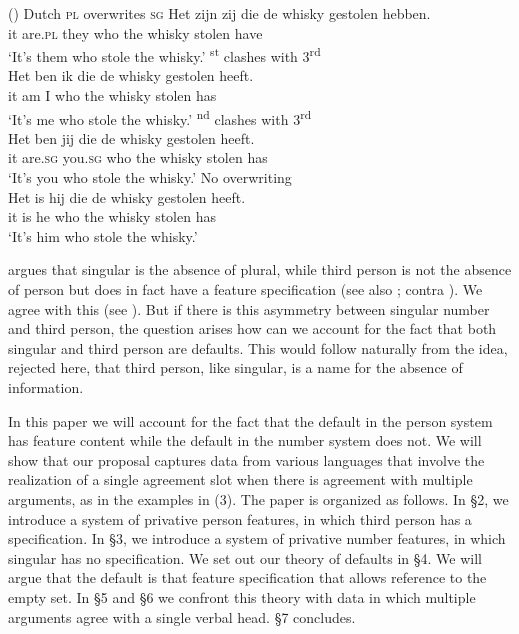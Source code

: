 \documentclass[output=paper]{langsci/langscibook}
\begin{document}
\ea (\label{bkm:Ref328731088}\label{bkm:Ref294426209})  Dutch
\ea \textsc{pl} overwrites \textsc{sg}
\gll Het zijn    zij    die  de  whisky gestolen hebben.\\
    it    are.\textsc{pl} they who the whisky stolen     have\\
\glt    ‘It’s them who stole the whisky.’
\textsuperscript{st} clashes with 3\textsuperscript{rd}\\
\gll * Het ben ik die  de  whisky gestolen heeft.  \\
    {} it     am  I  who the whisky stolen     has\\
\glt ‘It’s me who stole the whisky.’
\textsuperscript{nd} clashes with 3\textsuperscript{rd}\\
\gll * Het ben      jij        die    de whisky gestolen heeft.\\
    {} it     are.\textsc{sg} you.\textsc{sg} who the whisky stolen     has\\
\glt ‘It’s you who stole the whisky.’
\ex No overwriting \\
\gll Het is hij die   de whisky gestolen heeft.\\
    it     is he who the whisky stolen     has\\
\glt    ‘It’s him who stole the whisky.’
\z 
\z

\citet{Nevins2007,Nevins2011} argues that singular is the absence of plural, while third person is not the absence of person but does in fact have a feature specification (see also \citealt{Kerstens1993,Halle1997}; contra \citealt{Forchheimer1953,Kayne1993,Harley2002Person,Bejar2003,Cysouw2003,Anagnostopoulou2005Strong,Adger2007}). We agree with this (see \citealt{Ackema2013,Ackema2018}). But if there is this asymmetry between singular number and third person, the question arises how can we account for the fact that both singular and third person are defaults. This would follow naturally from the idea, rejected here, that third person, like singular, is a name for the absence of information.

In this paper we will account for the fact that the default in the person system has feature content while the default in the number system does not. We will show that our proposal captures data from various languages that involve the realization of a single agreement slot when there is agreement with multiple arguments, as in the examples in (3). The paper is organized as follows. In §2, we introduce a system of privative person features, in which third person has a specification. In §3, we introduce a system of privative number features, in which singular has no specification. We set out our theory of defaults in §4. We will argue that the default is that feature specification that allows reference to the empty set. In §5 and §6 we confront this theory with data in which multiple arguments agree with a single verbal head. §7 concludes.
\end{document}
